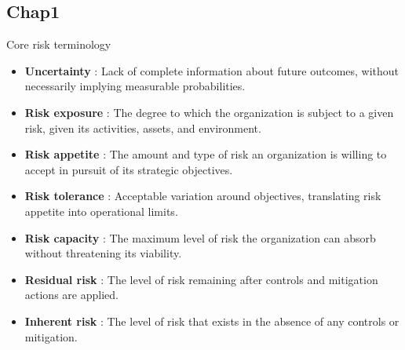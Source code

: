 \documentclass[aspectratio=169, 10pt]{beamer} %
\begin{document}
\subsection{Chap1}
\begin{frame}{Core risk terminology}
\begin{itemize}
    \item[$\bullet$] \textbf{Uncertainty} :
    Lack of complete information about future outcomes, without necessarily
    implying measurable probabilities.

    \item[$\bullet$] \textbf{Risk exposure} :
    The degree to which the organization is subject to a given risk, given its
    activities, assets, and environment.

    \item[$\bullet$] \textbf{Risk appetite} :
    The amount and type of risk an organization is willing to accept in pursuit
    of its strategic objectives.

    \item[$\bullet$] \textbf{Risk tolerance} :
    Acceptable variation around objectives, translating risk appetite into
    operational limits.

    \item[$\bullet$] \textbf{Risk capacity} :
    The maximum level of risk the organization can absorb without threatening
    its viability.

    \item[$\bullet$] \textbf{Residual risk} :
    The level of risk remaining after controls and mitigation actions are applied.

    \item[$\bullet$] \textbf{Inherent risk} :
    The level of risk that exists in the absence of any controls or mitigation.

\end{itemize}

\end{frame}
\end{document}
